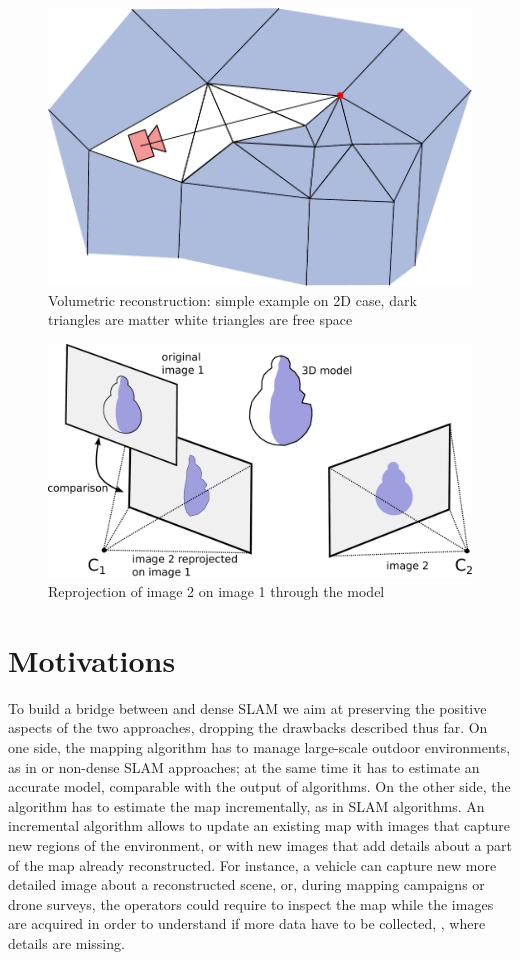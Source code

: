 \begin{figure}[tp]
 \centering
 \includegraphics[width=0.925\columnwidth]{./img/spacecarv}
 \caption{Volumetric reconstruction: simple example on 2D case, dark triangles are matter white triangles are free space}
 \label{fig:Volumetricc}
\end{figure}
\begin{figure}[tp]
 \centering
 \includegraphics[width=0.925\columnwidth]{./img/reprojOr}
 \caption{Reprojection of image 2 on  image 1 through the model}
 \label{fig:reproj}
\end{figure}


\section{Motivations}
To build a bridge between \mvs and dense SLAM we aim at preserving the positive aspects of the two approaches, dropping the drawbacks described thus far. 
On one side, the mapping algorithm has to manage large-scale outdoor environments, as in \mvs or non-dense SLAM approaches; at the same time it has to estimate an accurate model, comparable with the output of \mvs algorithms.
On the other  side, the algorithm has to estimate the map incrementally, as in SLAM algorithms.
An incremental algorithm allows to update an existing map with images that capture new regions of the environment, or with new images that add details about a part of the map already reconstructed.
For instance, a vehicle can capture new more detailed image about a reconstructed scene, or, during mapping campaigns or drone surveys, the operators could require to inspect the map while the images are  acquired in order to understand if more data have to be collected, \eg, where details are missing.



